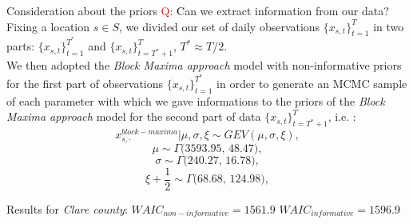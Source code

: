 \documentclass[usenames,dvipsnames]{beamer}
\begin{document}
\begin{frame}{Consideration about the priors}
\small
 \textcolor{red}Q: 
 \textcolor{black}Can we extract information from our data?\\
Fixing a location $s \in S$, we divided our set of daily observations $\{x_{s,t}\}_{t=1}^{T}$ in two parts: $\{x_{s,t}\}_{t=1}^{T^{*}}$ and $\{x_{s,t}\}_{t=T^{*}+1}^{T}$, $T^{*}\approx T/2$. \\
We then adopted the \textit{Block Maxima approach} model with non-informative priors for the first part of observations  $\{x_{s,t}\}_{t=1}^{T^{*}}$ in order to generate an MCMC sample of each parameter with which we gave informations to the priors of the \textit{Block Maxima approach} model for the second part of data $\{x_{s,t}\}_{t=T^{*}+1}^{T}$, i.e. : \\
\small
\begin{equation*}
    x_{s, \cdot}^{block-maxima}|\mu,\sigma,\xi \sim GEV(\mu,\sigma,\xi), 
\end{equation*}
\begin{equation*}
    \mu \sim \Gamma\textit{(3593.95, 48.47)},
\end{equation*}
\begin{equation*}
    \sigma \sim \Gamma\textit{(240.27, 16.78)},
\end{equation*}
\begin{equation*}
    \xi+\frac{1}{2} \sim \Gamma\textit{(68.68, 124.98)},
\end{equation*}

Results for \textit{Clare county}: $WAIC_{non-informative}= 1561.9$  $WAIC_{informative}= 1596.9$
    
\end{frame}
\end{document}

